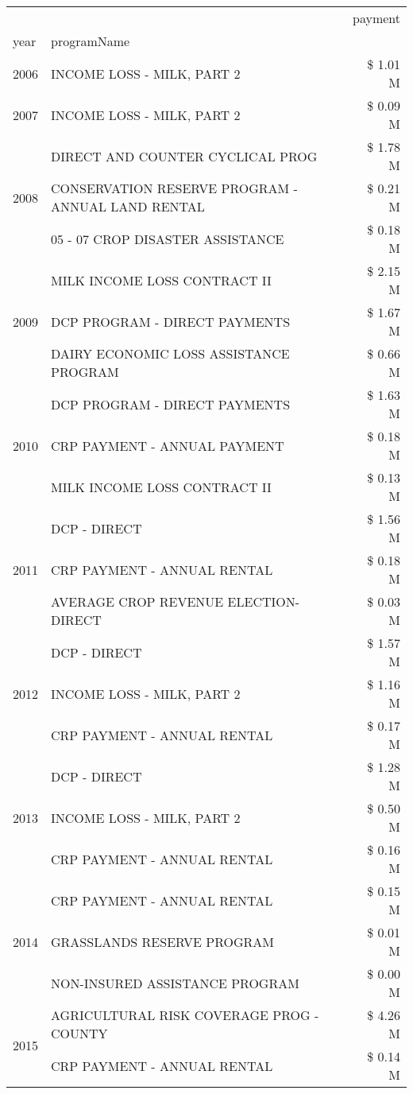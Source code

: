 \begin{tabular}{llr}
\toprule
 &  & payment \\
year & programName &  \\
\midrule
2006 & INCOME LOSS - MILK, PART 2 & \$ 1.01 M \\
\cline{1-3}
2007 & INCOME LOSS - MILK, PART 2 & \$ 0.09 M \\
\cline{1-3}
\multirow[t]{3}{*}{2008} & DIRECT AND COUNTER CYCLICAL PROG & \$ 1.78 M \\
 & CONSERVATION RESERVE PROGRAM - ANNUAL LAND RENTAL & \$ 0.21 M \\
 & 05 - 07 CROP DISASTER ASSISTANCE & \$ 0.18 M \\
\cline{1-3}
\multirow[t]{3}{*}{2009} & MILK INCOME LOSS CONTRACT II & \$ 2.15 M \\
 & DCP PROGRAM - DIRECT PAYMENTS & \$ 1.67 M \\
 & DAIRY ECONOMIC LOSS ASSISTANCE PROGRAM & \$ 0.66 M \\
\cline{1-3}
\multirow[t]{3}{*}{2010} & DCP PROGRAM - DIRECT PAYMENTS & \$ 1.63 M \\
 & CRP PAYMENT - ANNUAL PAYMENT & \$ 0.18 M \\
 & MILK INCOME LOSS CONTRACT II & \$ 0.13 M \\
\cline{1-3}
\multirow[t]{3}{*}{2011} & DCP - DIRECT & \$ 1.56 M \\
 & CRP PAYMENT - ANNUAL RENTAL & \$ 0.18 M \\
 & AVERAGE CROP REVENUE ELECTION-DIRECT & \$ 0.03 M \\
\cline{1-3}
\multirow[t]{3}{*}{2012} & DCP - DIRECT & \$ 1.57 M \\
 & INCOME LOSS - MILK, PART 2 & \$ 1.16 M \\
 & CRP PAYMENT - ANNUAL RENTAL & \$ 0.17 M \\
\cline{1-3}
\multirow[t]{3}{*}{2013} & DCP - DIRECT & \$ 1.28 M \\
 & INCOME LOSS - MILK, PART 2 & \$ 0.50 M \\
 & CRP PAYMENT - ANNUAL RENTAL & \$ 0.16 M \\
\cline{1-3}
\multirow[t]{3}{*}{2014} & CRP PAYMENT - ANNUAL RENTAL & \$ 0.15 M \\
 & GRASSLANDS RESERVE PROGRAM & \$ 0.01 M \\
 & NON-INSURED ASSISTANCE PROGRAM & \$ 0.00 M \\
\cline{1-3}
\multirow[t]{3}{*}{2015} & AGRICULTURAL RISK COVERAGE PROG - COUNTY & \$ 4.26 M \\
 & CRP PAYMENT - ANNUAL RENTAL & \$ 0.14 M \\

\end{tabular}

